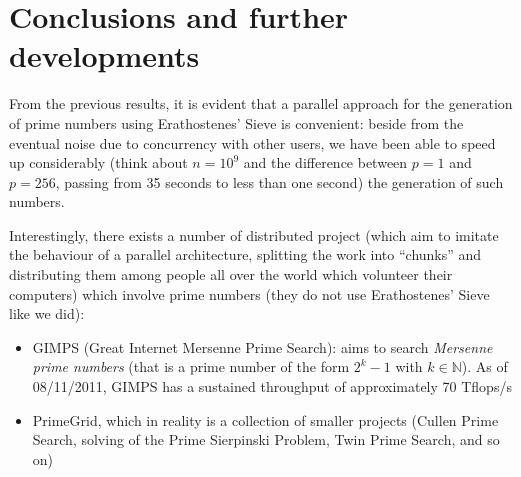 \documentclass[a4paper,11pt]{article}
\newcommand{\N}{\mathbb{N}}
\begin{document}
\section{Conclusions and further developments}

From the previous results, it is evident that a parallel approach for the generation of prime numbers using Erathostenes' Sieve is convenient: beside from the eventual noise due to concurrency with other users, we have been able to speed up considerably (think about $n=10^9$ and the difference between $p=1$ and $p=256$, passing from 35 seconds to less than one second) the generation of such numbers.

Interestingly, there exists a number of distributed project (which aim to imitate the behaviour of a parallel architecture, splitting the work into ``chunks'' and distributing them among people all over the world which volunteer their computers) which involve prime numbers (they do not use Erathostenes' Sieve like we did):

\begin{itemize}
\item GIMPS (Great Internet Mersenne Prime Search)\citep{gimps}: aims to search \emph{Mersenne prime numbers} (that is a prime number of the form $2^k-1$ with $k \in \N$). As of 08/11/2011, GIMPS has a sustained throughput of approximately 70 Tflops/s\citep{gimps2}
\item PrimeGrid\citep{primegrid}, which in reality is a collection of smaller projects (Cullen Prime Search, solving of the Prime Sierpinski Problem, Twin Prime Search, and so on)
\end{itemize}

\printbibliography
\end{document}
